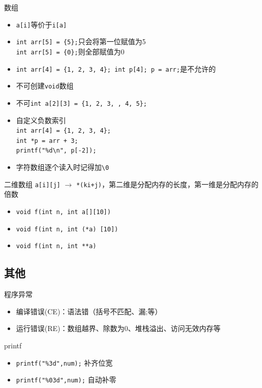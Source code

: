 \documentclass{myslide}
\begin{document}
\begin{frame}[fragile]{数组}
\begin{itemize}[<+->]
	\item \verb'a[i]'等价于\verb'i[a]'
	\item \verb'int arr[5] = {5};'只会将第一位赋值为5\\
		\verb'int arr[5] = {0};'则全部赋值为0
	\item \verb'int arr[4] = {1, 2, 3, 4}; int p[4]; p = arr;'是不允许的
	\item 不可创建\verb'void'数组
	\item 不可\verb'int a[2][3] = {1, 2, 3, , 4, 5};'
	\item 自定义负数索引\\
		\verb'int arr[4] = {1, 2, 3, 4};'\\
		\verb'int *p = arr + 3;'\\
		\verb'printf("%d\n", p[-2]);'
	\item 字符数组逐个读入时记得加\verb'\0'
\end{itemize}
\end{frame}

\begin{frame}[fragile]{二维数组}
\verb'a[i][j]' $\to$ \verb'*(ki+j)'，第二维是分配内存的长度，第一维是分配内存的倍数
\begin{itemize}
	\item \verb'void f(int n, int a[][10])'
	\item \verb'void f(int n, int (*a) [10])'
	\item \verb'void f(int n, int **a)'
\end{itemize}
\end{frame}

\subsection{其他}
\begin{frame}
\subsectionpage
\end{frame}

\begin{frame}{程序异常}
\begin{itemize}
	\item 编译错误(CE)：语法错（括号不匹配、漏;等）
	\item 运行错误(RE)：数组越界、除数为0、堆栈溢出、访问无效内存等
\end{itemize}
\end{frame}

\begin{frame}[fragile]{printf}
\begin{itemize}
	\item \verb'printf("%3d",num);' 补齐位宽
	\item \verb'printf("%03d",num);' 自动补零
\end{itemize}
\end{frame}
\end{document}
